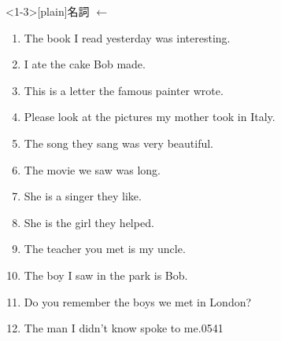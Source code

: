 \documentclass[aspectratio=169,xcolor={dvipsnames,table}]{beamer}
\begin{document}
\begin{frame}<1-3>[plain]{名詞 $\leftarrow$ }
 \begin{enumerate}
  \item The book  I read yesterday was interesting.
  \item I ate the cake  Bob made.
  \item This is a letter  the famous painter wrote.
  \item Please look at the pictures  my mother took in Italy.
  \item The song  they sang was very beautiful.
  \item The movie  we saw was long.
  \item She is a singer  they like.
  \item She is the girl  they helped.
  \item The teacher  you met is my uncle.
  \item The boy  I saw in the park is Bob.
  \item Do you remember the boys  we met in London?
  \item The man  I didn't know spoke to me.\hfill{\tiny 0541}\,{\scriptsize {}}

 \end{enumerate}
\end{frame}
\end{document}
